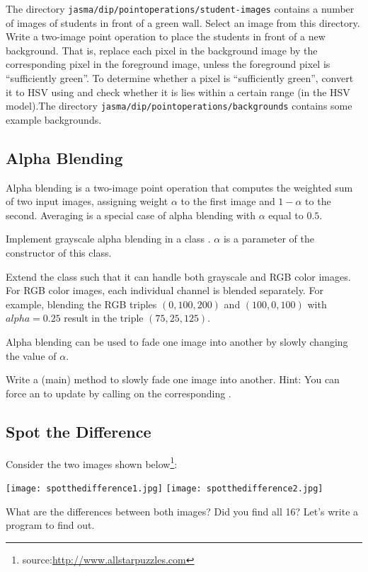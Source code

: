 \documentclass{book}
\begin{document}
\begin{exercise}
The directory \texttt{jasma/dip/pointoperations/student-images} contains a number of images of students in front of a green wall. Select an image from this directory. Write a two-image point operation to place the students in front of a new background. That is, replace each pixel in the background image by the corresponding pixel in the foreground image, unless the foreground pixel is ``sufficiently green''. To determine whether a pixel is ``sufficiently green'', convert it to HSV using  and check whether it is lies within a certain range (in the HSV model).The directory \texttt{jasma/dip/pointoperations/backgrounds} contains some example backgrounds.
\end{exercise}

\subsection{Alpha Blending}
Alpha blending is a two-image point operation that computes the weighted sum of two input images, assigning weight $\alpha$ to the first image and $1 - \alpha$ to the second. Averaging is a special case of alpha blending with $\alpha$ equal to $0.5$.

\begin{exercise}
Implement grayscale alpha blending in a class . $\alpha$ is a parameter of the constructor of this class.
\end{exercise}

\begin{exercise}
Extend the class  such that it can handle both grayscale and RGB color images. For RGB color images, each individual channel is blended separately. For example, blending the RGB triples $(0, 100, 200)$ and $(100, 0, 100)$ with $alpha=0.25$ result in the triple $(75, 25, 125)$.   
\end{exercise}

Alpha blending can be used to fade one image into another by slowly changing the value of $\alpha$. 

\begin{exercise}
Write a (main) method to slowly fade one image into another. Hint: You can force an  to update by calling  on the corresponding .
\end{exercise}

\subsection{Spot the Difference}
Consider the two images shown below\footnote{source:\href{http://www.allstarpuzzles.com}{http://www.allstarpuzzles.com}}:
\begin{center}
\texttt{[image: spotthedifference1.jpg]}
\texttt{[image: spotthedifference2.jpg]}
\end{center}
What are the differences between both images? Did you find all 16? Let's write a program to find out.
\end{document}
